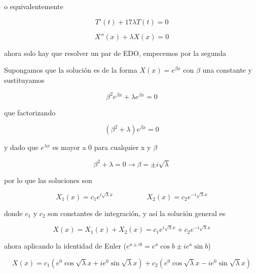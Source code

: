 \documentclass[12pt,a4paper]{article}
\begin{document}
\begin{enumerate}
    o equivalentemente
    
    \begin{equation*}
        T'(t) +17\lambda T(t) = 0
    \end{equation*}
    
    \begin{equation*}
        X''(x) +\lambda X(x) = 0
    \end{equation*}
    
    ahora solo hay que resolver un par de EDO, empecemos por la segunda
    
    Supongamos que la solución es de la forma $X(x) = e^{\beta x}$ con $\beta$ una constante y sustituyamos
    
    \begin{equation*}
         \beta^2 e^{\beta x} +\lambda e^{\beta x}  = 0
    \end{equation*}
    
    que factorizando
    
    \begin{equation*}
        (\beta^2 + \lambda ) e^{\beta x} = 0
    \end{equation*}
    
    y dado que $e^{\lambda x}$ es mayor a 0 para cualquier x y $\beta$
    
    \begin{equation*}
        \beta^2 + \lambda = 0 \rightarrow \beta = \pm i\sqrt{\lambda}
    \end{equation*}
    
    por lo que las soluciones son
    
    \begin{equation*}
        X_1 (x) = c_1 e^{i\sqrt{\lambda} x} \hspace{2cm} X_2(x) = c_2 e^{-i \sqrt{\lambda} x}
    \end{equation*}
    
    donde $c_1$ y $c_2$ son constantes de integración, y así la  solución general es
    
    \begin{equation*}
        X(x) = X_1(x) + X_2(x) = c_1 e^{i\sqrt{\lambda} x} + c_2 e^{-i \sqrt{\lambda} x}
    \end{equation*}
    
    ahora aplicando la identidad de Euler ($e^{a\pm ib} = e^{a} \cos{b}\pm i e^{a} \sin{b}$)
    
    \begin{equation*}
        X(x) = c_1 (e^{0} \cos{\sqrt{\lambda}x}+ i e^{0} \sin{\sqrt{\lambda}x}) + c_2 (e^{0} \cos{\sqrt{\lambda }x} - i e^{0} \sin{\sqrt{\lambda}x})
    \end{equation*}
    

\end{enumerate}
\end{document}

